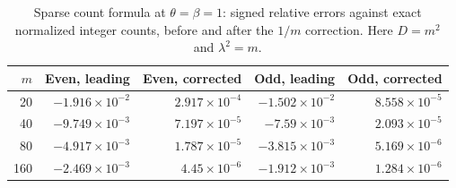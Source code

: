 \begin{table}[tbp]
\centering
\small
\begin{tabular}{rrrrr}
\toprule
$m$ & Even, leading & Even, corrected & Odd, leading & Odd, corrected \\
\midrule
20 & $-1.916\times10^{-2}$ & $2.917\times10^{-4}$ & $-1.502\times10^{-2}$ & $8.558\times10^{-5}$ \\
40 & $-9.749\times10^{-3}$ & $7.197\times10^{-5}$ & $-7.59\times10^{-3}$ & $2.093\times10^{-5}$ \\
80 & $-4.917\times10^{-3}$ & $1.787\times10^{-5}$ & $-3.815\times10^{-3}$ & $5.169\times10^{-6}$ \\
160 & $-2.469\times10^{-3}$ & $4.45\times10^{-6}$ & $-1.912\times10^{-3}$ & $1.284\times10^{-6}$ \\
\bottomrule
\end{tabular}
\caption{Sparse count formula at $\theta=\beta=1$: signed relative errors against exact normalized integer counts, before and after the $1/m$ correction. Here $D=m^2$ and $\lambda^2=m$.}
\label{tab:verification-sparse}
\end{table}
